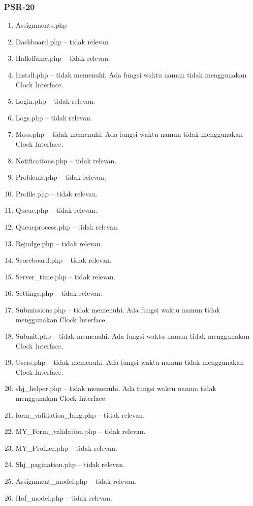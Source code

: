\subsubsection{PSR-20}
\begin{enumerate}
	\item Assignments.php
	\item Dashboard.php -- tidak relevan
	\item Halloffame.php -- tidak relevan
	\item Install.php -- tidak memenuhi.
	Ada fungsi waktu namun tidak menggunakan Clock Interface.
	\item Login.php -- tidak relevan.
	\item Logs.php -- tidak relevan.
	\item Moss.php -- tidak memenuhi.
	Ada fungsi waktu namun tidak menggunakan Clock Interface.
	\item Notifications.php -- tidak relevan.
	\item Problems.php -- tidak relevan.
	\item Profile.php -- tidak relevan.
	\item Queue.php -- tidak relevan.
	\item Queueprocess.php -- tidak relevan.
	\item Rejudge.php -- tidak relevan.
	\item Scoreboard.php -- tidak relevan.
	\item Server\_time.php -- tidak relevan.
	\item Settings.php -- tidak relevan.
	\item Submissions.php -- tidak memenuhi.
	Ada fungsi waktu namun tidak menggunakan Clock Interface.
	\item Submit.php -- tidak memenuhi.
	Ada fungsi waktu namun tidak menggunakan Clock Interface.
	\item Users.php -- tidak memenuhi.
	Ada fungsi waktu namun tidak menggunakan Clock Interface.
	\item shj\_helper.php -- tidak memenuhi.
	Ada fungsi waktu namun tidak menggunakan Clock Interface.
	\item form\_validation\_lang.php -- tidak relevan.
	\item MY\_Form\_validation.php -- tidak relevan.
	\item MY\_Profiler.php -- tidak relevan.
	\item Shj\_pagination.php -- tidak relevan.
	\item Assignment\_model.php -- tidak relevan.
	\item Hof\_model.php -- tidak relevan.

\end{enumerate}

